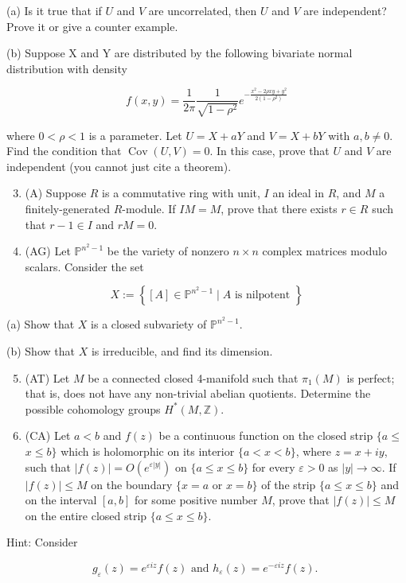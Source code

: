 \documentclass[10pt]{article}
\begin{document}
(a) Is it true that if $U$ and $V$ are uncorrelated, then $U$ and $V$ are independent? Prove it or give a counter example.

(b) Suppose $\mathrm{X}$ and $\mathrm{Y}$ are distributed by the following bivariate normal distribution with density

$$
f(x, y)=\frac{1}{2 \pi} \frac{1}{\sqrt{1-\rho^{2}}} e^{-\frac{x^{2}-2 \rho x y+y^{2}}{2\left(1-\rho^{2}\right)}}
$$

where $0<\rho<1$ is a parameter. Let $U=X+a Y$ and $V=X+b Y$ with $a, b \neq 0$. Find the condition that $\operatorname{Cov}(U, V)=0$. In this case, prove that $U$ and $V$ are independent (you cannot just cite a theorem).

\begin{enumerate}
  \setcounter{enumi}{2}
  \item (A) Suppose $R$ is a commutative ring with unit, $I$ an ideal in $R$, and $M$ a finitely-generated $R$-module. If $I M=M$, prove that there exists $r \in R$ such that $r-1 \in I$ and $r M=0$.

  \item (AG) Let $\mathbb{P}^{n^{2}-1}$ be the variety of nonzero $n \times n$ complex matrices modulo scalars. Consider the set

\end{enumerate}

$$
X:=\left\{[A] \in \mathbb{P}^{n^{2}-1} \mid A \text { is nilpotent }\right\}
$$

(a) Show that $X$ is a closed subvariety of $\mathbb{P}^{n^{2}-1}$.

(b) Show that $X$ is irreducible, and find its dimension.

\begin{enumerate}
  \setcounter{enumi}{4}
  \item (AT) Let $M$ be a connected closed 4-manifold such that $\pi_{1}(M)$ is perfect; that is, does not have any non-trivial abelian quotients. Determine the possible cohomology groups $H^{*}(M, \mathbb{Z})$.

  \item (CA) Let $a<b$ and $f(z)$ be a continuous function on the closed strip $\{a \leq$ $x \leq b\}$ which is holomorphic on its interior $\{a<x<b\}$, where $z=x+i y$, such that $|f(z)|=O\left(e^{\varepsilon|y|}\right)$ on $\{a \leq x \leq b\}$ for every $\varepsilon>0$ as $|y| \rightarrow \infty$. If $|f(z)| \leq M$ on the boundary $\{x=a$ or $x=b\}$ of the strip $\{a \leq x \leq b\}$ and on the interval $[a, b]$ for some positive number $M$, prove that $|f(z)| \leq M$ on the entire closed strip $\{a \leq x \leq b\}$.

\end{enumerate}

Hint: Consider

$$
g_{\varepsilon}(z)=e^{\varepsilon i z} f(z) \text { and } h_{\varepsilon}(z)=e^{-\varepsilon i z} f(z) \text {. }
$$
\end{document}
